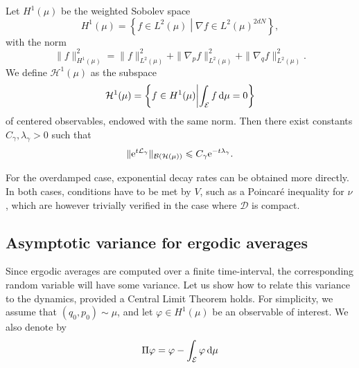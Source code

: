         \begin{prop}
            Let $H^1(\mu)$ be the weighted Sobolev space 
            \begin{equation}
                \label{eq:weighted_sobolev_space}
                H^1(\mu)=\left\{f\in L^2(\mu) \middle| \nabla f \in L^2(\mu)^{2dN}\right\},
            \end{equation}
            with the norm 
            \[\|f\|^2_{H^1(\mu)}=\|f\|^2_{L^2(\mu)}+\|\nabla_p f\|^2_{L^2(\mu)}+\|\nabla_q f\|^2_{L^2(\mu)}.\]
            We define $\mathcal H^1(\mu)$ as the subspace
            \[\mathcal H^1(\mu)=\left\{f\in H^1(\mu) \middle| \int_{\mathcal E}f\,\mathrm{d} \mu=0\right\}\]
            of centered observables, endowed with the same norm. Then there exist constants $C_\gamma,\lambda_\gamma >0$ such that 
            \begin{equation}
                \label{eq:semigroup_exp_decay}
                \|\mathrm{e}^{t\mathcal{L}_\gamma}\|_{\mathcal{B}(\mathcal{H}(\mu))}\leqslant C_\gamma \mathrm{e}^{-t\lambda_\gamma}.
            \end{equation}
        \end{prop}
        For the overdamped case, exponential decay rates can be obtained more directly. 
        In both cases, conditions have to be met by $V$, such as a Poincaré inequality for $\nu$, which are however trivially verified in the case where $\mathcal D$ is compact.
        
        \subsection{Asymptotic variance for ergodic averages}
        Since ergodic averages are computed over a finite time-interval, the corresponding random variable will have some variance. 
        Let us show how to relate this variance to the dynamics, provided a Central Limit Theorem holds.
        For simplicity, we assume that $(q_0,p_0)\sim \mu$, and let $\varphi \in H^1(\mu)$ be an observable of interest. We also denote by
        \begin{equation}
            \label{eq:equilibrium_projector}
            \Pi \varphi = \varphi -\int_\mathcal{E}\varphi\,\mathrm{d} \mu
        \end{equation}
        
